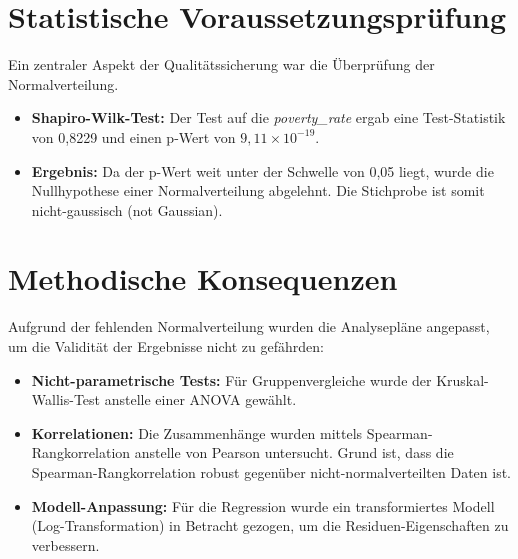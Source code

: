 \section*{Statistische Voraussetzungsprüfung}
Ein zentraler Aspekt der Qualitätssicherung war die Überprüfung der Normalverteilung. 
\begin{itemize}
    \item \textbf{Shapiro-Wilk-Test:} Der Test auf die \textit{poverty\_rate} ergab eine Test-Statistik von 0,8229 und einen p-Wert von $9,11 \times 10^{-19}$.
    \item \textbf{Ergebnis:} Da der p-Wert weit unter der Schwelle von 0,05 liegt, wurde die Nullhypothese einer Normalverteilung abgelehnt. Die Stichprobe ist somit nicht-gaussisch (not Gaussian).
\end{itemize}

\section*{Methodische Konsequenzen}
Aufgrund der fehlenden Normalverteilung wurden die Analysepläne angepasst, um die Validität der Ergebnisse nicht zu gefährden:
\begin{itemize}
    \item \textbf{Nicht-parametrische Tests:} Für Gruppenvergleiche wurde der Kruskal-Wallis-Test anstelle einer ANOVA gewählt.
    \item \textbf{Korrelationen:} Die Zusammenhänge wurden mittels Spearman-Rangkorrelation anstelle von Pearson untersucht. Grund ist, dass die Spearman-Rangkorrelation robust gegenüber nicht-normalverteilten Daten ist.
    \item \textbf{Modell-Anpassung:} Für die Regression wurde ein transformiertes Modell (Log-Transformation) in Betracht gezogen, um die Residuen-Eigenschaften zu verbessern.
\end{itemize}
